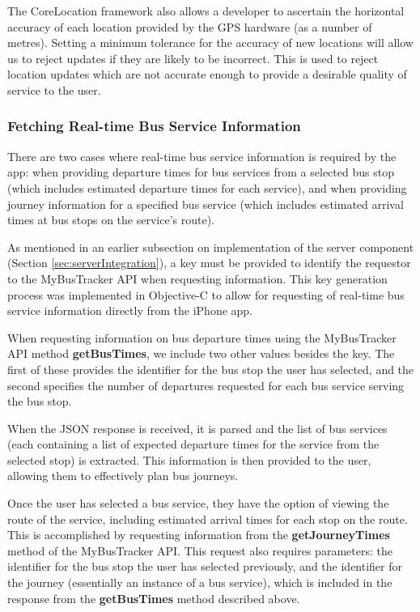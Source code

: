 \documentclass[10pt,twocolumn]{article}
\begin{document}
The CoreLocation framework also allows a developer to ascertain the horizontal accuracy of each location provided by the GPS hardware (as a number of metres). Setting a minimum tolerance for the accuracy of new locations will allow us to reject updates if they are likely to be incorrect. This is used to reject location updates which are not accurate enough to provide a desirable quality of service to the user.

\subsubsection{Fetching Real-time Bus Service Information}
There are two cases where real-time bus service information is required by the app: when providing departure times for bus services from a selected bus stop (which includes estimated departure times for each service), and when providing journey information for a specified bus service (which includes estimated arrival times at bus stops on the service's route).

As mentioned in an earlier subsection on implementation of the server component (Section \ref{sec:serverIntegration}), a key must be provided to identify the requestor to the MyBusTracker API when requesting information. This key generation process was implemented in Objective-C to allow for requesting of real-time bus service information directly from the iPhone app.

When requesting information on bus departure times using the MyBusTracker API method \textbf{getBusTimes}, we include two other values besides the key. The first of these provides the identifier for the bus stop the user has selected, and the second specifies the number of departures requested for each bus service serving the bus stop.

When the JSON response is received, it is parsed and the list of bus services (each containing a list of expected departure times for the service from the selected stop) is extracted. This information is then provided to the user, allowing them to effectively plan bus journeys.

Once the user has selected a bus service, they have the option of viewing the route of the service, including estimated arrival times for each stop on the route. This is accomplished by requesting information from the \textbf{getJourneyTimes} method of the MyBusTracker API. This request also requires parameters: the identifier for the bus stop the user has selected previously, and the identifier for the journey (essentially an instance of a bus service), which is included in the response from the \textbf{getBusTimes} method described above.
\end{document}

